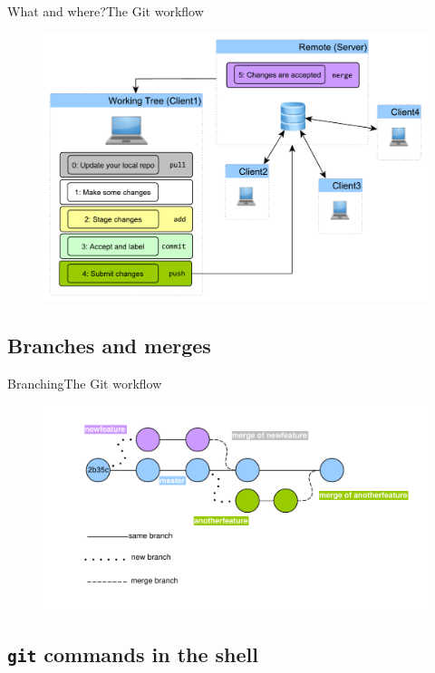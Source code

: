 \documentclass[dvipsnames, usenames]{beamer}
\begin{document}
\begin{frame}{What and where?}{The Git workflow}
	\begin{figure}[h]
		\centering
		\includegraphics[width=0.97\columnwidth]{stages}
		\label{fig:git-workflow}
	\end{figure}
\end{frame}

\subsection{Branches and merges}

\begin{frame}{Branching}{The Git workflow}
	\begin{figure}[h]
		\centering
		\includegraphics[width=0.97\columnwidth]{branches}
		\label{fig:git-branches}
	\end{figure}
\end{frame}

\subsection{\texttt{git} commands in the shell}
\end{document}
